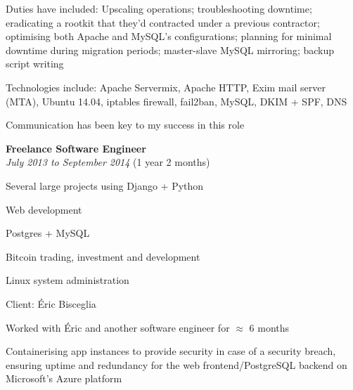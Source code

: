 \documentclass[12pt]{article}
\newenvironment{outerlist}[1][\enskip\textbullet]%
	{\begin{itemize}[#1]}{\end{itemize}%
		\vspace{-.6\baselineskip}}
\newenvironment{innerlist}[1][\enskip\textbullet]%
	{\begin{compactitem}[#1]}{\end{compactitem}}
\newcommand{\halfblankline}{\quad\vspace{-0.5\baselineskip}\pagebreak[3]}
\begin{document}
\begin{outerlist}
\begin{innerlist}
				\item Duties have included: Upscaling operations; troubleshooting downtime; eradicating a rootkit that they'd contracted under a previous contractor; optimising both Apache and MySQL's configurations; planning for minimal downtime during migration periods; master-slave MySQL mirroring; backup script writing
				\item Technologies include: Apache Servermix, Apache HTTP, Exim mail server (MTA), Ubuntu 14.04, iptables firewall, fail2ban, MySQL, DKIM + SPF, DNS
				\item Communication has been key to my success in this role
			\end{innerlist}
		\end{outerlist}
		
		\halfblankline
		
		\vspace{-2mm}
		\begin{outerlist}
			\item[] \textbf{Freelance Software Engineer} \\
			\textit{July 2013 to September 2014} (1 year 2 months)
			\begin{innerlist}
				\item Several large projects using Django + Python
				\item Web development
				\item Postgres + MySQL
				\item Bitcoin trading, investment and development
				\item Linux system administration
			\end{innerlist}
			\item[] Client: Éric Bisceglia
			\begin{innerlist}
				\item Worked with Éric and another software engineer for $\approx$ 6 months
				\item Containerising app instances to provide security in case of a security breach, ensuring uptime and redundancy for the web frontend/PostgreSQL backend on Microsoft's Azure platform
			\end{innerlist}
		\end{outerlist}
		
		\halfblankline
		
\end{document}
